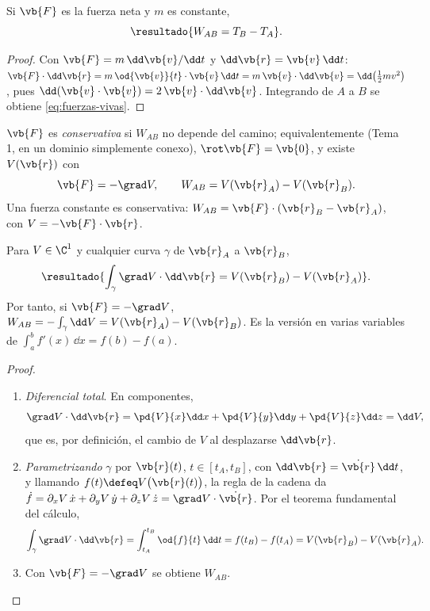 \begin{teorema}
\label{teo:fuerzas-vivas}
Si $\vb{F}$ es la fuerza neta y $m$ es constante,
\begin{equation}
  \resultado{W_{AB}=T_{B}-T_{A}} .
  \label{eq:fuerzas-vivas}
\end{equation}
\end{teorema}

\begin{proof}
Con $\vb{F}=m\,\dd\vb{v}/\dd t$ y $\dd\vb{r}=\vb{v}\,\dd t$:
$\vb{F}\cdot\dd\vb{r}=m\,\od{\vb{v}}{t}\cdot\vb{v}\,\dd t=m\,\vb{v}\cdot\dd\vb{v}
=\dd\bigl(\tfrac12 m v^{2}\bigr)$, pues $\dd(\vb{v}\cdot\vb{v})=2\,\vb{v}\cdot\dd\vb{v}$.
Integrando de $A$ a $B$ se obtiene \eqref{eq:fuerzas-vivas}.
\end{proof}

\begin{definicion}
$\vb{F}$ es \emph{conservativa} si $W_{AB}$ no depende del camino;
equivalentemente (Tema 1, en un dominio simplemente conexo),
$\rot\vb{F}=\vb{0}$, y existe $V(\vb{r})$ con
\begin{equation}
  \vb{F}=-\grad V,\qquad W_{AB}=V(\vb{r}_{A})-V(\vb{r}_{B}).
\end{equation}
Una fuerza constante es conservativa: $W_{AB}=\vb{F}\cdot(\vb{r}_{B}-\vb{r}_{A})$, con $V=-\vb{F}\cdot\vb{r}$.
\end{definicion}

\begin{teorema}
\label{teo:gradiente}
Para $V\in\C^{1}$ y cualquier curva $\gamma$ de $\vb{r}_{A}$ a $\vb{r}_{B}$,
\begin{equation}
  \resultado{\int_{\gamma}\grad V\cdot\dd\vb{r}=V(\vb{r}_{B})-V(\vb{r}_{A})} .
  \label{eq:gradiente}
\end{equation}
Por tanto, si $\vb{F}=-\grad V$,
$W_{AB}=-\int_{\gamma}\dd V=V(\vb{r}_{A})-V(\vb{r}_{B})$.
Es la versión en varias variables de $\int_{a}^{b}f'(x)\,\dd x=f(b)-f(a)$.
\end{teorema}

\begin{proof}
\begin{enumerate}
  \item \emph{Diferencial total}. En componentes,
  \[
    \grad V\cdot\dd\vb{r}=\pd{V}{x}\dd x+\pd{V}{y}\dd y+\pd{V}{z}\dd z=\dd V,
  \]
  que es, por definición, el cambio de $V$ al desplazarse $\dd\vb{r}$.
  \item \emph{Parametrizando} $\gamma$ por $\vb{r}(t)$, $t\in[t_{A},t_{B}]$, con $\dd\vb{r}=\dot{\vb{r}}\,\dd t$, y llamando
  $f(t)\defeq V\bigl(\vb{r}(t)\bigr)$, la regla de la cadena da
  $\dot f=\partial_{x}V\,\dot x+\partial_{y}V\,\dot y+\partial_{z}V\,\dot z=\grad V\cdot\dot{\vb{r}}$. Por el teorema
  fundamental del cálculo,
  \[
    \int_{\gamma}\grad V\cdot\dd\vb{r}=\int_{t_{A}}^{t_{B}}\od{f}{t}\,\dd t=f(t_{B})-f(t_{A})=V(\vb{r}_{B})-V(\vb{r}_{A}) .
  \]
  \item Con $\vb{F}=-\grad V$ se obtiene $W_{AB}$.\qedhere
\end{enumerate}
\end{proof}

